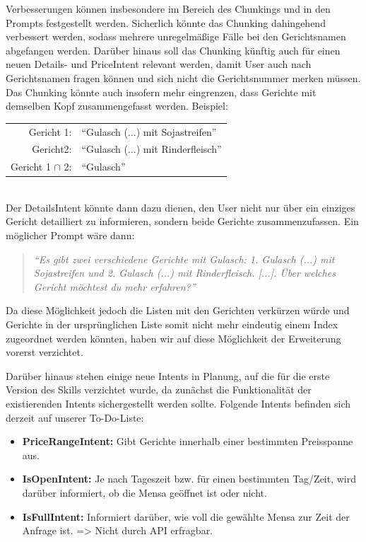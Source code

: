 \documentclass[12pt]{article}
\begin{document}
Verbesserungen können insbesondere im Bereich des Chunkings und in den Prompts festgestellt werden.
Sicherlich könnte das Chunking dahingehend verbessert werden, sodass mehrere unregelmäßige Fälle bei den Gerichtsnamen abgefangen werden.
Darüber hinaus soll das Chunking künftig auch für einen neuen Details- und PriceIntent relevant werden, damit User auch nach Gerichtsnamen fragen können und sich nicht die Gerichtsnummer merken müssen.
Das Chunking könnte auch insofern mehr eingrenzen, dass Gerichte mit demselben Kopf zusammengefasst werden. 
Beispiel:
\newline
~\\
\begin{tabular}{rl}
	Gericht 1:& “Gulasch (...) mit Sojastreifen” \\
	Gericht2:& “Gulasch (...) mit Rinderfleisch” \\
	Gericht 1 $\cap$ 2:& “Gulasch” \\
\end{tabular}
~\\
\newline
Der DetailsIntent könnte dann dazu dienen, den User nicht nur über ein einziges Gericht detailliert zu informieren, sondern beide Gerichte zusammenzufassen.
Ein möglicher Prompt wäre dann: \begin{quote}\emph{“Es gibt zwei verschiedene Gerichte mit Gulasch: 1. Gulasch (...) mit Sojastreifen und 2. Gulasch (...) mit Rinderfleisch. [...]. Über welches Gericht möchtest du mehr erfahren?”}\end{quote}
Da diese Möglichkeit jedoch die Listen mit den Gerichten verkürzen würde und Gerichte in der ursprünglichen Liste somit nicht mehr eindeutig einem Index zugeordnet werden könnten, haben wir auf diese Möglichkeit der Erweiterung vorerst verzichtet.

Darüber hinaus stehen einige neue Intents in Planung, auf die für die erste Version des Skills verzichtet wurde, da zunächst die Funktionalität der existierenden Intents sichergestellt werden sollte.
Folgende Intents befinden sich derzeit auf unserer To-Do-Liste:

\begin{itemize}
\setlength\itemsep{0em}
	\item \textbf{PriceRangeIntent:} Gibt Gerichte innerhalb einer bestimmten Preisspanne aus.
	\item \textbf{IsOpenIntent:} Je nach Tageszeit bzw. für einen bestimmten Tag/Zeit, wird darüber informiert, ob die Mensa geöffnet ist oder nicht.
	\item \textbf{IsFullIntent:} Informiert darüber, wie voll die gewählte Mensa zur Zeit der Anfrage ist. => Nicht durch API erfragbar.
\end{itemize}
\end{document}
